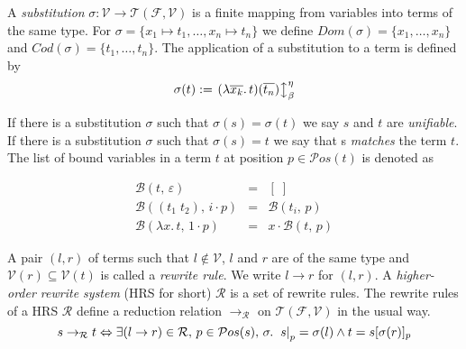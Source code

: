 A {\em substitution} $\sigma : \mathcal{V} \to \mathcal{T}(\mathcal{F},\mathcal{V})$ is a finite mapping from variables into terms of the same type. For $\sigma = \{x_1 \mapsto t_1,\ldots,x_n \mapsto t_n\}$ we define $Dom(\sigma) = \{x_1,\ldots,x_n\}$ and $Cod(\sigma) = \{t_1,\ldots,t_n\}$. The application of a substitution to a term is defined by 
$$\sigma(t) := \left. (\lambda \overline{x_k}.\, t)(\overline{t_n}) \right\updownarrow^{\eta}_{\beta}$$

If there is a substitution $\sigma$ such that $\sigma(s) = \sigma(t)$ we say $s$ and $t$ are {\em unifiable}. If there is a substitution $\sigma$ such that $\sigma(s) = t$ we say that s {\em matches} the term $t$. The list of bound variables in a term $t$ at position $p \in \mathcal{P}os(t)$ is denoted as

$$
\begin{array}{lcl}
\mathcal{B}(t,\,\varepsilon) &=& [\;]\\
\mathcal{B}((t_1 \; t_2),\,i \cdot p) &=& \mathcal{B}(t_i,\, p)\\
\mathcal{B}(\lambda x.\, t,\,1 \cdot p) &=& x \cdot \mathcal{B}(t,\, p)
\end{array}
$$

A pair $(l,r)$ of terms such that $l \notin \mathcal{V}$, $l$ and $r$ are of the same type and $\mathcal{V}(r) \subseteq \mathcal{V}(t)$ is called a {\em rewrite rule}. We write $l \to r$ for $(l,r)$. A {\em higher-order rewrite system} (HRS for short) $\mathcal{R}$ is a set of rewrite rules. The rewrite rules of a HRS $\mathcal{R}$ define a reduction relation $\to_{\mathcal{R}}$ on $\mathcal{T}(\mathcal{F},\mathcal{V})$ in the usual way.
$$ s \to_{\mathcal{R}} t \Leftrightarrow \exists (l \to r) \in \mathcal{R},\, p \in \mathcal{P}os(s),\, \sigma.\; \left. s \right|_{p} = \sigma(l) \wedge t = s[\sigma(r)]_{p}$$

